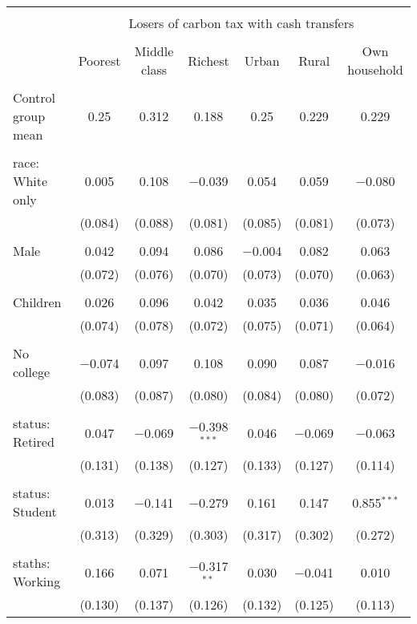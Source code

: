 
\begin{tabular}{@{\extracolsep{5pt}}lcccccc} 
\\[-1.8ex]\hline 
\hline \\[-1.8ex] 
 & \multicolumn{6}{c}{Losers of carbon tax with cash transfers} \\ 
\cline{2-7} 
\\[-1.8ex] & Poorest & Middle class & Richest & Urban & Rural & Own household \\ 
\hline \\[-1.8ex] 
 Control group mean & 0.25 & 0.312 & 0.188 & 0.25 & 0.229 & 0.229  \\ \hline \\[-1.8ex] race: White only & 0.005 & 0.108 & $-$0.039 & 0.054 & 0.059 & $-$0.080 \\ 
  & (0.084) & (0.088) & (0.081) & (0.085) & (0.081) & (0.073) \\ 
  & & & & & & \\ 
 Male & 0.042 & 0.094 & 0.086 & $-$0.004 & 0.082 & 0.063 \\ 
  & (0.072) & (0.076) & (0.070) & (0.073) & (0.070) & (0.063) \\ 
  & & & & & & \\ 
 Children & 0.026 & 0.096 & 0.042 & 0.035 & 0.036 & 0.046 \\ 
  & (0.074) & (0.078) & (0.072) & (0.075) & (0.071) & (0.064) \\ 
  & & & & & & \\ 
 No college & $-$0.074 & 0.097 & 0.108 & 0.090 & 0.087 & $-$0.016 \\ 
  & (0.083) & (0.087) & (0.080) & (0.084) & (0.080) & (0.072) \\ 
  & & & & & & \\ 
 status: Retired & 0.047 & $-$0.069 & $-$0.398$^{***}$ & 0.046 & $-$0.069 & $-$0.063 \\ 
  & (0.131) & (0.138) & (0.127) & (0.133) & (0.127) & (0.114) \\ 
  & & & & & & \\ 
 status: Student & 0.013 & $-$0.141 & $-$0.279 & 0.161 & 0.147 & 0.855$^{***}$ \\ 
  & (0.313) & (0.329) & (0.303) & (0.317) & (0.302) & (0.272) \\ 
  & & & & & & \\ 
 staths: Working & 0.166 & 0.071 & $-$0.317$^{**}$ & 0.030 & $-$0.041 & 0.010 \\ 
  & (0.130) & (0.137) & (0.126) & (0.132) & (0.125) & (0.113) \\ 

\end{tabular}
